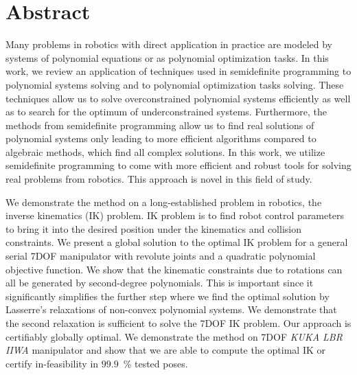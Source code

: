\chapter*{Abstract}
Many problems in robotics with direct application in practice are modeled by systems of polynomial equations or as polynomial optimization tasks.
In this work, we review an application of techniques used in semidefinite programming to polynomial systems solving and to polynomial optimization tasks solving.
These techniques allow us to solve overconstrained polynomial systems efficiently as well as to search for the optimum of underconstrained systems.
Furthermore, the methods from semidefinite programming allow us to find real solutions of polynomial systems only leading to more efficient algorithms compared to algebraic methods, which find all complex solutions.
In this work, we utilize semidefinite programming to come with more efficient and robust tools for solving real problems from robotics.
This approach is novel in this field of study.

We demonstrate the method on a long-established problem in robotics, the inverse kinematics (IK) problem.
IK problem is to find robot control parameters to bring it into the desired position under the kinematics and collision constraints.
We present a global solution to the optimal IK problem for a general serial 7DOF manipulator with revolute joints and a quadratic polynomial objective function.
We show that the kinematic constraints due to rotations can all be generated by second-degree polynomials.
This is important since it significantly simplifies the further step where we find the optimal solution by Lasserre's relaxations of non-convex polynomial systems.
We demonstrate that the second relaxation is sufficient to solve the 7DOF IK problem.
Our approach is certifiably globally optimal.
We demonstrate the method on 7DOF \textit{KUKA LBR IIWA} manipulator and show that we are able to compute the optimal IK or certify in-feasibility in $99.9$~\% tested poses.
